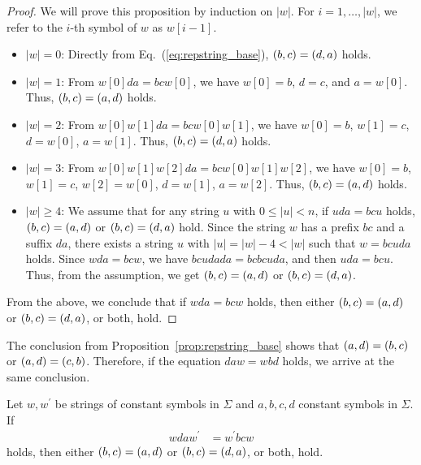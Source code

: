 \begin{proof}
  We will prove this proposition by induction on $|w|$.
  For $i=1,\ldots,|w|$, we refer to the $i$-th symbol of $w$ as $w[i - 1]$. 
  \begin{itemize}
  \item $|w| = 0$: Directly from Eq.~(\ref{eq:repstring_base}), $(b,c) = (d,a)$ holds.
  \item $|w| = 1$: From $w[0]da = bcw[0]$, we have $w[0] = b$, $d = c$, and $a = w[0]$. Thus, $(b,c) = (a,d)$ holds.
  \item $|w| = 2$: From $w[0]w[1]da = bcw[0]w[1]$, we have $w[0] = b$, $w[1] = c$, $d = w[0]$, $a = w[1]$. Thus, $(b,c) = (d,a)$ holds.
  \item $|w| = 3$: From $w[0]w[1]w[2]da = bcw[0]w[1]w[2]$, we have $w[0] = b$, $w[1] = c$, $w[2] = w[0]$, $d = w[1]$, $a = w[2]$. Thus, $(b,c) = (a,d)$ holds.
  \item $|w| \ge 4$: We assume that for any string $u$ with $0\leq |u| < n$, if $uda = bcu$ holds, $(b,c) = (a,d)$ or $(b,c) = (d,a)$ hold. Since the string $w$ has a prefix $bc$ and a suffix $da$, there exists a string $u$ with $|u| = |w| - 4 < |w|$ such that $w = bcuda$ holds. Since $wda = bcw$, we have $bcudada = bcbcuda$, and then $uda = bcu$. Thus, from the assumption, we get $(b,c) = (a,d)$ or $(b,c) = (d,a)$.
  \end{itemize}
From the above, we conclude that if $wda = bcw$ holds, then either $(b,c) = (a,d)$ or $(b,c) = (d,a)$, or both, hold.
\end{proof}

The conclusion from Proposition~\ref{prop:repstring_base} shows that $(a,d) = (b,c)$ or $(a,d) = (c,b)$. Therefore, if the equation $daw = wbd$ holds, we arrive at the same conclusion.

\begin{prop}\label{prop:repstring}
Let $w,w^{\prime}$ be strings of constant symbols in $\Sigma$ and $a,b,c,d$ constant symbols in $\Sigma$.
If
\begin{align}
  wdaw^{\prime} & = w^{\prime}bcw\label{eq:repstring}
\end{align}
holds, then either $(b,c) = (a,d)$ or $(b,c) = (d,a)$, or both, hold.\label{prop:repstring_eq}
\end{prop}

